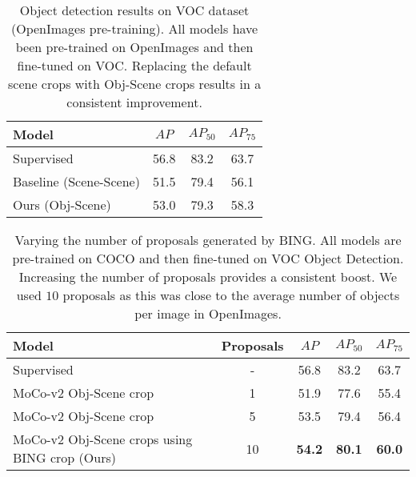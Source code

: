\begin{table*}
    \centering
    \begin{tabu} to \linewidth {lccc} 
        \toprule
        Model & $AP$ & $AP_{50}$ & $AP_{75}$ \\
         \midrule
    Supervised & 56.8 & 83.2 & 63.7 \\
     \midrule
    Baseline (Scene-Scene)	 \citep{chen2020improved}  & 51.5 & 79.4 & 56.1\\
    Ours (Obj-Scene)	 \citep{chen2020improved}  & 53.0 & 79.3 & 58.3\\
    
    
        \bottomrule
    \end{tabu}
    \caption{Object detection results on VOC dataset (OpenImages pre-training). All models have been pre-trained on OpenImages and then fine-tuned on VOC.  Replacing the default scene crops with Obj-Scene crops results in a consistent improvement. }
    \label{tab:voc_moco_openimages}
    
\end{table*}





\begin{table*}
    \centering
    \begin{tabu} to \linewidth {lcccc} 
        \toprule
        Model & Proposals  & $AP$ & $AP_{50}$ & $AP_{75}$ \\
         \midrule
    Supervised & - & 56.8 & 83.2 & 63.7 \\
     \midrule
    
    MoCo-v2 Obj-Scene crop \citep{chen2020improved}  & 1 & 51.9 & 77.6 & 55.4\\
    MoCo-v2 Obj-Scene crop \citep{chen2020improved}  & 5 & 53.5 & 79.4 & 56.4\\
    
    MoCo-v2 Obj-Scene crops using BING crop (Ours)  & 10&  \textbf{54.2} &  \textbf{80.1} & \textbf{60.0}\\
        \bottomrule
    \end{tabu}
    \caption{Varying the number of proposals generated by BING. All models are pre-trained on COCO and then fine-tuned on VOC Object Detection. Increasing the number of proposals provides a consistent boost. We used $10$ proposals as this was close to the average number of objects per image in OpenImages.}
    \label{tab:voc_moco_proposals}
    
\end{table*}


